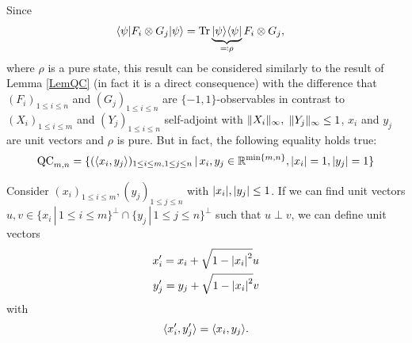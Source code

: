 	\begin{rmk}\label{rmk:tsirelson}
		Since 
		\begin{align}
			\langle {\psi} \vert F_i\otimes G_j \vert {\psi} \rangle &= \textup{Tr} \, {\underbrace{\vert {\psi} \rangle\langle {\psi} \vert}_{\eqqcolon\rho}F_i\otimes G_j} ,
		\end{align}
		where $\rho$ is a pure state, this result can be considered similarly to the result of Lemma \ref{LemQC} (in fact it is a direct consequence) with the difference that $(F_i)_{1\leq i \leq n}$ and $(G_j)_{1\leq i \leq n}$ are $\{-1,1\}$-observables in contrast to $(X_i)_{1\leq i \leq m}$ and $(Y_j)_{1\leq i \leq n}$ self-adjoint with $ \Vert {X_i} \Vert_\infty,$ $ \Vert {Y_j} \Vert_\infty\leq 1$, $x_i$ and $y_j$ are unit vectors and $\rho$ is pure. But in fact, the following equality holds true:
		\begin{equation}
			\textup{QC}_{m,n} = \{(\langle{x_i},{y_j}\rangle)_{1\leq i\leq m, 1\leq j \leq n} \,| \, x_i,y_j \in \mathbb{R}^{\min\{m,n\}}, {\left|{x_i}\right|}=1, {\left|{y_j}\right|}=1\}
		\end{equation}
		
		Consider $(x_i)_{1\leq i \leq m},(y_j)_{1\leq j \leq n}$ with ${\left|{x_i}\right|},{\left|{y_j}\right|} \leq 1$. If we can find unit vectors $u,v\in\{x_i\,| \, 1\leq i \leq m\}^\perp \cap \{y_j\,| \, 1\leq j \leq n\}^\perp$ such that $u\perp v$, we can define unit vectors
		\begin{align*}
			x_i^\prime = x_i + \sqrt{1-{\left|{x_i}\right|}^2}u\\
			y_j^\prime = y_j + \sqrt{1-{\left|{x_i}\right|}^2}v\\  
		\end{align*}
		with
		\[
			\langle{x_i^\prime},{y_j^\prime}\rangle = \langle{x_i},{y_j}\rangle.
		\] 
		
		

\end{rmk}
